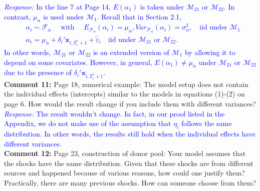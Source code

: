 \documentclass[12pt]{article}
\newcommand{\response}[1]{\noindent \textcolor{blue}{\emph{Response:} #1}}
\begin{document}
\response{In the line 7 at Page 14, $E(\alpha_1)$ is taken under $\mathcal{M}_{21}$ or $\mathcal{M}_{22}$. In contrast, $\mu_{\alpha}$ is used under $\mathcal{M}_{1}$. Recall that in Section 2.1,
\begin{align*}
  &\alpha_i \sim \mathcal{F}_{\alpha} 
 \quad  \text{ with }\quad  E_{\mathcal{F}_{\alpha}}(\alpha_i) =\mu_{\alpha}, Var_{\mathcal{F}_{\alpha}}(\alpha_i)=\sigma^2_{\alpha},\quad   \text{iid under } \mathcal{M}_1\\
 & \alpha_i = \mu_{\alpha} +\delta_i'\mathbf{x}_{i, T_i^*+1} + \tilde{\varepsilon}_i\quad  \text{iid under } \mathcal{M}_{21} \text{ or } \mathcal{M}_{22}.
\end{align*}
In other words,  $\mathcal{M}_{21}$  or $\mathcal{M}_{22}$ is an extended version of $\mathcal{M}_{1}$ by allowing it to depend on some covariates. However, in general, $E(\alpha_1)\neq \mu_{\alpha}$ under   $\mathcal{M}_{21}$  or $\mathcal{M}_{22}$ due to the presence of $\delta_i'\mathbf{x}_{i, T_i^*+1}$.} \\

{\bf Comment 11:} Page 18, numerical example: The model setup does not contain the individual effects (intercepts) similar to the models in equations (1)-(2) on page 6. How would the result change if you include them with different variances? \\

\response{The result wouldn't change. In fact, in our proof listed in the Appendix, we do not make use of the assumption that $\eta_i$ follows the same distribution. In other words, the results  still hold when the individual effects have different variances.}\\


{\bf Comment 12:} Page 23, construction of donor pool: Your model assumes that the shocks have the same distribution. Given that these shocks are from different sources and happened because of various reasons, how could one justify them? Practically, there are many previous shocks. How can someone choose from them?\\
\end{document}
